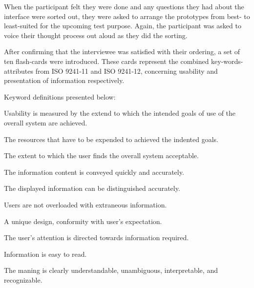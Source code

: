 {    When the participant felt they were done and any questions they had
    about the interface were sorted out, they were asked to arrange the
    prototypes from best- to least-suited for the upcoming test purpose.
    Again, the participant was asked to voice their thought process out
    aloud as they did the sorting.

    After confirming that the interviewee was satisfied with their ordering, a
    set of ten flash-cards were introduced. These cards represent the combined
    key-words-attributes from ISO 9241-11\cite{citeISO9241} and ISO
    9241-12\cite{citeISO9241-12}, concerning usability and presentation of
    information respectively.

    Keyword definitions presented below:

        \begin{description}[style=nextline]
          \item[Effectiveness]{
            Usability is measured by the extend to which the
            intended goals of use of the overall system are achieved.
          }
          \item[Efficiency]{
            The resources that have to be expended to achieved the indented
            goals.
          }
          \item[Satisfaction]{
            The extent to which the user finds the overall system
            acceptable.
          }
          \item[Clarity]{
              The information content is conveyed quickly and accurately.
          }
          \item[Discriminability]{
              The displayed information can be distinguished
              accurately.
          }
          \item[Conciseness]{
              Users are not overloaded with extraneous information.
          }
          \item[Consistency]{
              A unique design, conformity with user's expectation.
          }
          \item[Detectability]{
              The user's attention is directed towards information
              required.
          }
          \item[Legibility]{
              Information is easy to read.
          }
          \item[Comprehensibility]{
              The maning is clearly understandable, unambiguous,
              interpretable, and recognizable.
          }
        \end{description}

}
